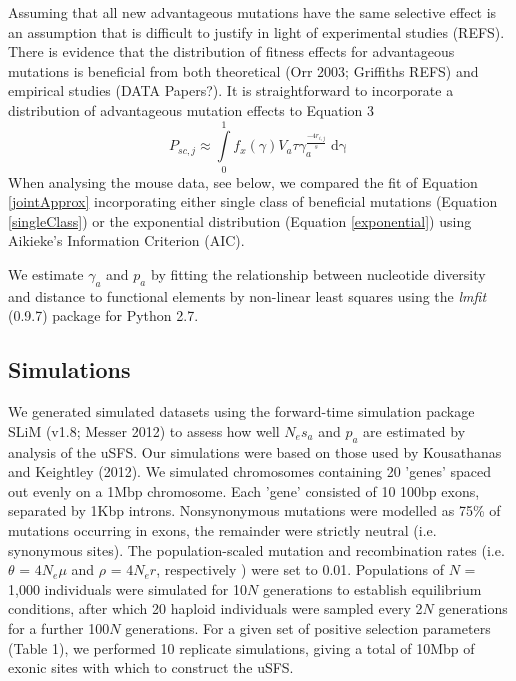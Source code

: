 \documentclass[11pt]{article}
\begin{document}
	Assuming that all new advantageous mutations have the same selective effect is an assumption that is difficult to justify in light of experimental studies (REFS). There is evidence that the distribution of fitness effects for advantageous mutations is beneficial from both theoretical (Orr 2003; Griffiths REFS) and empirical studies (DATA Papers?). It is straightforward to incorporate a distribution of advantageous mutation effects to Equation 3
		\begin{equation}
		\label{exponential}
P_{sc,j} \approx \int \limits_{0}^{1} f_x(\gamma) V_a \tau\gamma_a^{\frac{-4r_{i,j}}{s}} \mathop{d\gamma}
		\end{equation}
When analysing the mouse data, see below, we compared the fit of Equation \ref{jointApprox} incorporating either single class of beneficial mutations (Equation \ref{singleClass}) or the exponential distribution (Equation \ref{exponential}) using Aikieke's Information Criterion (AIC).

	
	We estimate $\gamma_a$ and $p_a$ by fitting the relationship between nucleotide diversity and distance to functional elements by non-linear least squares using the \emph{lmfit} (0.9.7) package for Python 2.7.
 
	\subsection*{Simulations}
	
	We generated simulated datasets using the forward-time simulation package SLiM (v1.8; Messer 2012) to assess how well $N_es_a$ and $p_a$ are estimated by analysis of the uSFS. Our simulations were based on those used by Kousathanas and Keightley (2012). We simulated chromosomes containing 20 'genes' spaced out evenly on a 1Mbp chromosome. Each 'gene' consisted of 10 100bp exons, separated by 1Kbp introns.  Nonsynonymous mutations were modelled as 75\% of mutations occurring in exons,  the remainder were strictly neutral (i.e. synonymous sites). The population-scaled mutation and recombination rates (i.e. $\theta$ = \emph{$4N_{e}\mu$} and $\rho$ = \emph{$4N_{e}r$}, respectively ) were set to 0.01. Populations of $N$ = 1,000 individuals were simulated for 10$N$ generations to establish equilibrium conditions, after which 20 haploid individuals were sampled every 2$N$ generations for a further 100$N$ generations. For a given set of positive selection parameters (Table 1), we performed 10 replicate simulations, giving a total of 10Mbp of exonic sites with which to construct the uSFS.
	
\end{document}
